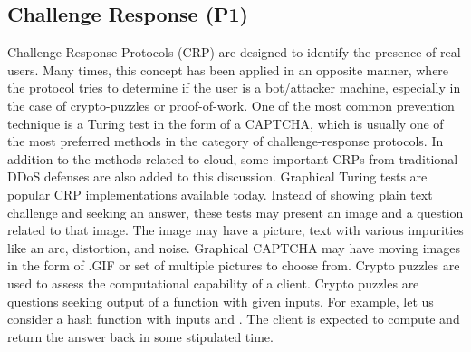 \documentclass[final,5p,times,twocolumn]{elsarticle}
\begin{document}
\subsection{Challenge Response (P1)}
\label{SectionP1}
\par {Challenge-Response Protocols (CRP) are designed to identify the presence of real users. Many times, this concept has been applied in an opposite manner, where the protocol tries to determine if the user is a bot/attacker machine, especially in the case of crypto-puzzles or proof-of-work. One of the most common prevention technique is a Turing test in the form of a CAPTCHA, which is usually one of the most preferred methods in the category of challenge-response protocols. In addition to the methods related to cloud, some important CRPs from traditional DDoS defenses are also added to this discussion. Graphical Turing tests are popular CRP implementations available today. Instead of showing plain text challenge and seeking an answer, these tests may present an image and a question related to that image. The image may have a picture, text with various impurities like an arc, distortion, and noise. Graphical CAPTCHA may have moving images in the form of .GIF or set of multiple pictures to choose from. Crypto puzzles are used to assess the computational capability of a client. Crypto puzzles are questions seeking output of a function with given inputs. For example, let us consider a hash function  with inputs  and . The client is expected to compute  and return the answer back in some stipulated time.}
\end{document}
